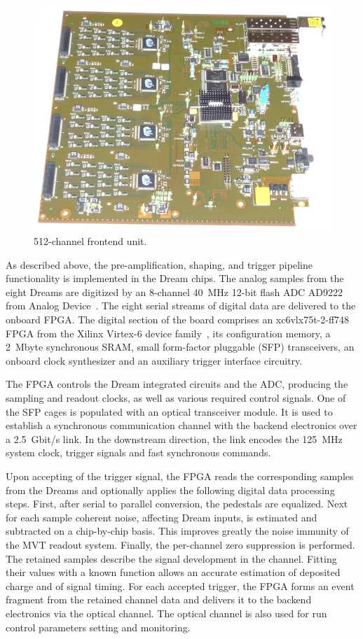 \begin{figure}[htb]
 \includegraphics[width=1.0\columnwidth,keepaspectratio]{images/electronics_fig3.png}
 \caption{512-channel frontend unit.}
 \label{fig:mm-e_3}
\end{figure}

As described above, the pre-amplification, shaping, and trigger pipeline functionality is implemented in the Dream chips. The analog samples from the eight Dreams are digitized by an 8-channel 40~MHz 12-bit flash ADC AD9222 from Analog Device~\cite{ADC}. The eight serial streams of digital data are delivered to the onboard FPGA.
The digital section of the board comprises an xc6vlx75t-2-ff748 FPGA from the Xilinx Virtex-6 device family~\cite{XIL}, its configuration memory, a 2~Mbyte synchronous SRAM, small form-factor pluggable (SFP) transceivers, an onboard clock synthesizer and an auxiliary trigger interface circuitry.

The FPGA controls the Dream integrated circuits and the ADC, producing the sampling and readout clocks, as well as various required control signals. One of the SFP cages is populated with an optical transceiver module. It is used to establish a synchronous communication channel with the backend electronics over a 2.5~Gbit/s link. In the downstream direction, the link encodes the 125~MHz system clock, trigger signals and fast synchronous commands.

Upon accepting of the trigger signal, the FPGA reads the corresponding samples from the Dreams and optionally applies the following digital data processing steps. First, after serial to parallel conversion, the pedestals are equalized. Next for each sample coherent noise, affecting Dream inputs, is estimated and subtracted on a chip-by-chip basis. This improves greatly the noise immunity of the MVT readout system. Finally, the per-channel zero suppression is performed. The retained samples describe the signal development in the channel. Fitting their values with a known function allows an accurate estimation of deposited charge and of signal timing. For each accepted trigger, the FPGA forms an event fragment from the retained channel data and delivers it to the backend electronics via the optical channel. The optical channel is also used for run control parameters setting and monitoring.

